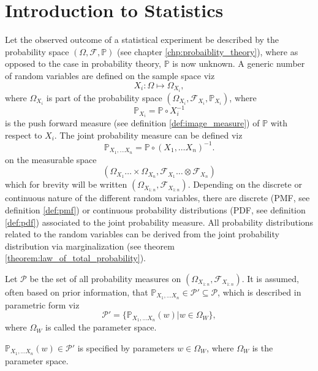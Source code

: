 \chapter{Introduction to Statistics}
\label{chp:statistics_introduction}
Let the observed outcome of a statistical experiment be described by the probability space $(\Omega, \mathcal{F}, \mathbb{P})$ (see chapter \ref{chp:probaiblity_theory}), where as opposed to the case in probability theory, $\mathbb{P}$ is now unknown. A generic number of random variables are defined on the sample space viz~\cite{orbanz2009functional,tausk2023basic, drewitz2019introduction,chan2021introduction}
\begin{equation}
	X_i: \Omega \mapsto \Omega_{X_i},
\end{equation} 
where $\Omega_{X_i}$ is part of the probability space $(\Omega_{X_i},\mathcal{F}_{X_i},\mathbb{P}_{X_i})$, where
\begin{equation}
	\mathbb{P}_{X_i} = \mathbb{P}\circ X_i^{-1}
\end{equation}
is the push forward measure (see definition \ref{def:image_measure}) of $\mathbb{P}$ with respect to $X_i$. The joint probability measure can be defined viz
\begin{equation}
	\mathbb{P}_{X_1,\dots X_n}= \mathbb{P}\circ(X_1,\dots X_n)^{-1}.
\end{equation}
on the measurable space 
\begin{equation}
	(\Omega_{X_1} \dots\times \Omega_{X_n}, \mathcal{F}_{X_1} \dots \otimes \mathcal{F}_{X_n})
\end{equation}
which for brevity will be written $(\Omega_{X_{1:n}},\mathcal{F}_{X_{1:n}})$. Depending on the discrete or continuous nature of the different random variables, there are discrete (PMF, see definition \ref{def:pmf}) or continuous probability distributions (PDF, see definition \ref{def:pdf}) associated to the joint probability measure. All probability distributions related to the random variables can be derived from the joint probability distribution via marginalization (see theorem \ref{theorem:law_of_total_probability}).

\begin{definition}
	Let $\mathcal{P}$ be the set of all probability measures on $(\Omega_{X_{1:n}},\mathcal{F}_{X_{1:n}})$. It is assumed, often based on prior information, that $\mathbb{P}_{X_1,\dots X_n}\in \mathcal{P}'\subseteq \mathcal{P}$, which is described in parametric form viz
	\begin{equation}
		\mathcal{P}'=\{\mathbb{P}_{X_1,\dots X_n}(w)| w \in \Omega_W\},
	\end{equation}
	where $\Omega_W$ is called the parameter space.
\end{definition}
\begin{definition}
	\label{def:parameter_space}
	$\mathbb{P}_{X_1,\dots X_n}(w)\in \mathcal{P}'$ is specified by parameters $w\in \Omega_W$, where $\Omega_W$ is the parameter space.
\end{definition}

